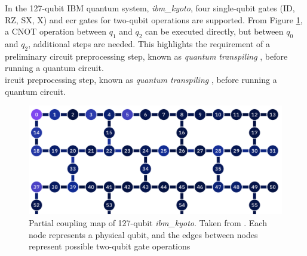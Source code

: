 In the 127-qubit IBM quantum system, \textit{ibm\_kyoto}, four single-qubit gates (ID, RZ, SX, X) and \acrshort{ecr} gates for two-qubit operations are supported. From Figure \ref{fig:ibm-kyoto}, a CNOT operation between $q_1$ and $q_2$ can be executed directly, but between $q_0$ and $q_2$, additional steps are needed. This highlights the requirement of a preliminary circuit preprocessing step, known as \textit{quantum transpiling} \cite{ferrari_compiler_2021}, before running a quantum circuit. \\
ircuit preprocessing step, known as \textit{quantum transpiling} \cite{ferrari_compiler_2021}, before running a quantum circuit. \\
\begin{figure}
    \centering
    \includegraphics[width=0.6\linewidth]{image/ibm_kyoto.png}
    \caption{Partial coupling map of 127-qubit \textit{ibm\_kyoto}. Taken from \citeauthor{ibmquantum_computeresources} \protect\cite{ibmquantum_computeresources}. Each node represents a physical qubit, and the edges between nodes represent possible two-qubit gate operations}
    \label{fig:ibm-kyoto}
\end{figure}

